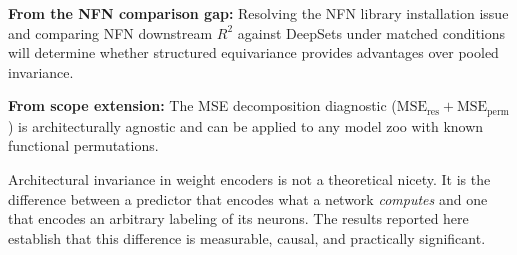 \textbf{From the NFN comparison gap:} Resolving the NFN library installation issue and comparing NFN downstream $R^2$ against DeepSets under matched conditions will determine whether structured equivariance provides advantages over pooled invariance.

\textbf{From scope extension:} The MSE decomposition diagnostic ($\text{MSE}_\text{res} + \text{MSE}_\text{perm}$) is architecturally agnostic and can be applied to any model zoo with known functional permutations.

Architectural invariance in weight encoders is not a theoretical nicety. It is the difference between a predictor that encodes what a network \emph{computes} and one that encodes an arbitrary labeling of its neurons. The results reported here establish that this difference is measurable, causal, and practically significant.
